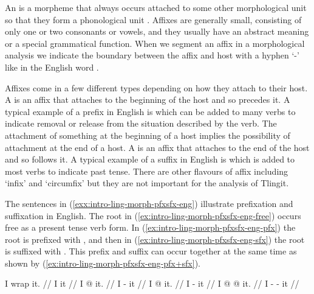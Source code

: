 An  is a morpheme that always occurs attached to some other morphological unit so that they form a phonological unit \parencite[9]{booij:2007}.
Affixes are generally small, consisting of only one or two consonants or vowels, and they usually have an abstract meaning or a special grammatical function.
When we segment an affix in a morphological analysis we indicate the boundary between the affix and host with a hyphen ‘-’ like in the English word .

Affixes come in a few different types depending on how they attach to their host.
A  is an affix that attaches to the beginning of the host and so precedes it.
A typical example of a prefix in English is  which can be added to many verbs to indicate removal or release from the situation described by the verb.
The attachment of something at the beginning of a host implies the possibility of attachment at the end of a host.
A  is an affix that attaches to the end of the host and so follows it.
A typical example of a suffix in English is  which is added to most verbs to indicate past tense.
There are other flavours of affix including ‘infix’ and ‘circumfix’ but they are not important for the analysis of Tlingit.

The sentences in (\ref{exx:intro-ling-morph-pfxsfx-eng}) illustrate prefixation and suffixation in English.
The root  in (\ref{ex:intro-ling-morph-pfxsfx-eng-free}) occurs free as a present tense verb form.
In (\ref{ex:intro-ling-morph-pfxsfx-eng-pfx}) the root is prefixed with , and then in (\ref{ex:intro-ling-morph-pfxsfx-eng-sfx}) the root is suffixed with .
This prefix and suffix can occur together at the same time as shown by (\ref{ex:intro-ling-morph-pfxsfx-eng-pfx+sfx}).

\pex\label{exx:intro-ling-morph-pfxsfx-eng}%
\a\label{ex:intro-ling-morph-pfxsfx-eng-free}%
%
\begingl
	\gla	I wrap it. //
	\glb	I  it //
\endgl
\a\label{ex:intro-ling-morph-pfxsfx-eng-pfx}%
%
\begingl
	\gla	I  @ {} it. //
	\glb	I -  it //
\endgl
\a\label{ex:intro-ling-morph-pfxsfx-eng-sfx}%
%
\begingl
	\gla	I  @ {} it. //
	\glb	I  - it //
\endgl
\a\label{ex:intro-ling-morph-pfxsfx-eng-pfx+sfx}%
%
\begingl
	\gla	I  @ {} @ {} it. //
	\glb	I -  - it //
\endgl
\xe

